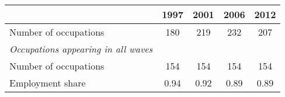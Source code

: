 \begin{tabular}{lcccc} \toprule
            &\multicolumn{1}{c}{1997}&\multicolumn{1}{c}{2001}&\multicolumn{1}{c}{2006}&\multicolumn{1}{c}{2012}\\
\midrule
Number of occupations       &         180&         219&         232&         207\vspace{3mm}\\
\textit{Occupations appearing in all waves}\\
\hspace{3mm}Number of occupations     &        154 & 154& 154& 154\\
\hspace{3mm}Employment share     &        0.94&        0.92&        0.89&        0.89\\
\bottomrule
\end{tabular}
